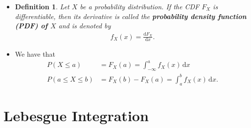 \documentclass[10pt]{article}
\newtheorem{definition}[lemma]{Definition}
\newcommand{\dee}{\mathrm{d}}
\begin{document}
\begin{itemize}
  \item \begin{definition}
    Let $X$ be a probability distribution. If the CDF $F_X$ is differentiable, then its derivative is called the {\bf probability density function (PDF) of $X$} and is denoted by
    \begin{align*}
      f_X(x) = \frac{\dee F_X}{\dee x}.
    \end{align*}    
  \end{definition}  

  \item We have that
  \begin{align*}
    P(X \leq a) &= F_X(a) = \int_{-\infty}^a f_X(x)\, \dee x \\
    P(a \leq X \leq b) &= F_X(b) - F_X(a) = \int_a^b f_X(x)\, \dee x.
  \end{align*}
\end{itemize}

\section{Lebesgue Integration}
\end{document}
